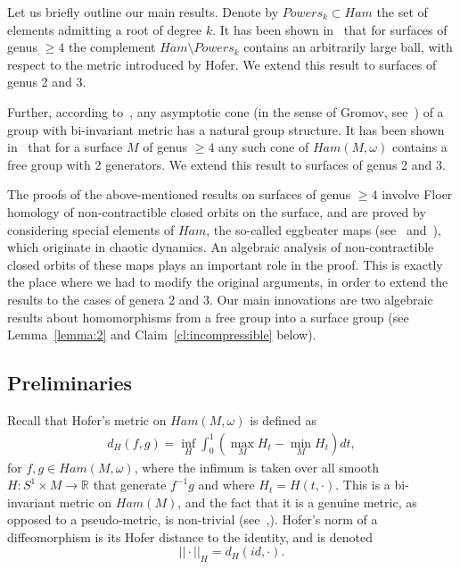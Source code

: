 \documentclass[11pt]{article}
\newenvironment{myequation}
    {
        \begin{equation*}
        \begin{gathered}
    }
    { 
        \end{gathered} 
        \end{equation*}
    }
\newcommand{\R}{\mathbb{R}}
\begin{document}
        Let us briefly outline our main results. Denote by $Powers_k \subset Ham$ the set of elements admitting a root of degree $k$. It has been shown in~\cite{PS14} that for surfaces of genus $\geq 4$ the complement $Ham \setminus Powers_k$ contains an arbitrarily large ball, with respect to the metric introduced by Hofer. We extend this result to surfaces of genus 2 and 3.
        
        Further, according to~\cite{CZ}, any asymptotic cone (in the sense of Gromov, see~\cite{G}) of a group with bi-invariant metric has a natural group structure. It has been shown in~\cite{10} that for a surface $M$ of genus $\geq 4$ any such cone of $Ham(M,\omega)$ contains a free group with 2 generators. We extend this result to surfaces of genus 2 and 3.
        
        The proofs of the above-mentioned results on surfaces of genus $\geq 4$ involve Floer homology of non-contractible closed orbits on the surface, and are proved by considering special elements of $Ham$, the so-called eggbeater maps (see~\cite{FO} and~\cite{PS14}), which originate in chaotic dynamics. An algebraic analysis of non-contractible closed orbits of these maps plays an important role in the proof. This is exactly the place where we had to modify the original arguments, in order to extend the results to the cases of genera 2 and 3. Our main innovations are two algebraic results about homomorphisms from a free group into a surface group (see Lemma~\ref{lemma:2} and Claim~\ref{cl:incompressible} below).
    
    \subsection{Preliminaries}
        Recall that Hofer's metric on $Ham(M,\omega)$ is defined as
        \begin{myequation}
            d_H(f,g) = \inf_H \int_0^1 \left( \max_M H_t - \min_M H_t \right) dt ,
        \end{myequation}
        for $f,g \in Ham(M,\omega)$, where the infimum is taken over all smooth $H: S^1 \times M \to \R$ that generate $f^{-1}g$ and where $H_t = H(t,\cdot)$. This is a bi-invariant metric on $Ham(M)$, and the fact that it is a genuine metric, as opposed to a pseudo-metric, is non-trivial (see~\cite{H},\cite{LM}). Hofer's norm of a diffeomorphism is its Hofer distance to the identity, and is denoted
        \[
            ||\cdot||_H = d_H(id,\cdot) .
        \]\\
        
\end{document}
